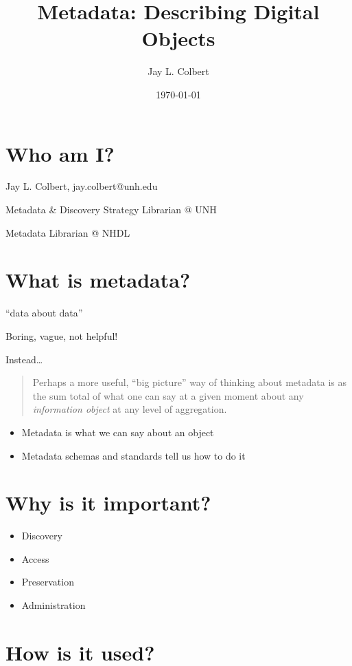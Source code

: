 \documentclass[11pt]{article}
\author{Jay L. Colbert}
\date{\today}
\title{Metadata: Describing Digital Objects}
\begin{document}
\maketitle

\section*{Who am I?}
\label{sec:org18c9968}

Jay L. Colbert, jay.colbert@unh.edu

Metadata \& Discovery Strategy Librarian @ UNH

Metadata Librarian @ NHDL

\section*{What is metadata?}
\label{sec:org052d453}
``data about data''

Boring, vague, not helpful!

Instead\ldots{}

\begin{quote}
Perhaps a more useful, ``big picture'' way of thinking about metadata is as the sum total of what one can say at a given moment about any \emph{information object} at any level of aggregation.
\end{quote}

\begin{itemize}
\item Metadata is what we can say about an object
\item Metadata schemas and standards tell us how to do it
\end{itemize}

\section*{Why is it important?}
\label{sec:orgb669ee8}
\begin{itemize}
\item Discovery
\item Access
\item Preservation
\item Administration
\end{itemize}

\section*{How is it used?}
\label{sec:orgcd17f69}
\end{document}
